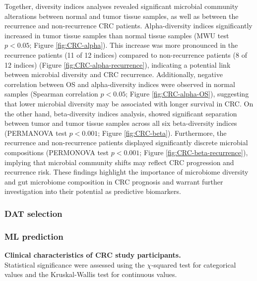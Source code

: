 \documentclass[11pt, a4paper, onecolumn, oneside]{report}
\begin{document}
                Together, diversity indices analyses revealed significant microbial community alterations between normal and tumor tissue samples, as well as between the recurrence and non-recurrence CRC patients. Alpha-diversity indices significantly increased in tumor tissue samples than normal tissue samples (MWU test $p < 0.05$; Figure \ref{fig:CRC-alpha}). This increase was more pronounced in the recurrence patients (11 of 12 indices) compared to non-recurrence patients (8 of 12 indices) (Figure \ref{fig:CRC-alpha-recurrence}), indicating a potential link between microbial diversity and CRC recurrence. Additionally, negative correlation between OS and alpha-diversity indices were observed in normal samples (Spearman correlation $p < 0.05$; Figure \ref{fig:CRC-alpha-OS}), suggesting that lower microbial diversity may be associated with longer survival in CRC. On the other hand, beta-diversity indices analysis, showed significant separation between tumor and tumor tissue samples across all six beta-diversity indices (PERMANOVA test $p < 0.001$; Figure \ref{fig:CRC-beta}). Furthermore, the recurrence and non-recurrence patients displayed significantly discrete microbial compositions (PERMONOVA test $p < 0.001$; Figure \ref{fig:CRC-beta-recurrence}), implying that microbial community shifts may reflect CRC progression and recurrence risk. These findings highlight the importance of microbiome diversity and gut microbiome composition in CRC prognosis and warrant further investigation into their potential as predictive biomarkers.

            \subsubsection{DAT selection}
            \subsubsection{ML prediction}

            \begin{table}
                \centering
                \caption[Clinical characteristics of CRC study participants]{\textbf{Clinical characteristics of CRC study participants.}\\
                    Statistical significance were assessed using the $\chi$-squared test for categorical values and the Kruskal-Wallis test for continuous values.}
                
                \nocite{tableone-1}
                \label{tab:CRC-clinical}
            \end{table}
            \clearpage
\end{document}
